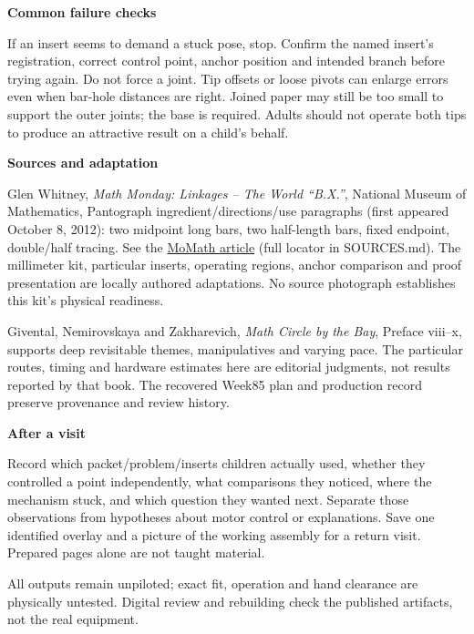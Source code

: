 \documentclass[11pt,letterpaper]{article}
\newcommand{\sub}[1]{\par\textbf{#1}\par}
\begin{document}
\sub{Common failure checks}
If an insert seems to demand a stuck pose, stop. Confirm the named insert's registration, correct control point, anchor position and intended branch before trying again. Do not force a joint. Tip offsets or loose pivots can enlarge errors even when bar-hole distances are right. Joined paper may still be too small to support the outer joints; the base is required. Adults should not operate both tips to produce an attractive result on a child's behalf.

\sub{Sources and adaptation}
Glen Whitney, \emph{Math Monday: Linkages -- The World ``B.X.''}, National Museum of Mathematics, Pantograph ingredient/directions/use paragraphs (first appeared October 8, 2012): two midpoint long bars, two half-length bars, fixed endpoint, double/half tracing. See the \href{https://momath.org/mathmonday/math-monday-01-03-11/math-monday-linkages-the-world-b-x/}{MoMath article} (full locator in SOURCES.md). The millimeter kit, particular inserts, operating regions, anchor comparison and proof presentation are locally authored adaptations. No source photograph establishes this kit's physical readiness.

Givental, Nemirovskaya and Zakharevich, \emph{Math Circle by the Bay}, Preface viii--x, supports deep revisitable themes, manipulatives and varying pace. The particular routes, timing and hardware estimates here are editorial judgments, not results reported by that book. The recovered Week85 plan and production record preserve provenance and review history.

\sub{After a visit}
Record which packet/problem/inserts children actually used, whether they controlled a point independently, what comparisons they noticed, where the mechanism stuck, and which question they wanted next. Separate those observations from hypotheses about motor control or explanations. Save one identified overlay and a picture of the working assembly for a return visit. Prepared pages alone are not taught material.

All outputs remain unpiloted; exact fit, operation and hand clearance are physically untested. Digital review and rebuilding check the published artifacts, not the real equipment.
\end{document}
